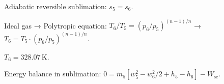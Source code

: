 Adiabatic reversible sublimation: \( s_5 = s_6 \).  

Ideal gas → Polytropic equation:  
\( T_6 / T_5 = (p_6 / p_5)^{(n-1)/n} \)  
→ \( T_6 = T_5 \cdot (p_6 / p_5)^{(n-1)/n} \).  

\( T_6 = 328.07 \, \text{K} \).  

Energy balance in sublimation:  
\( 0 = \dot{m}_5 \left[ w_5^2 - w_6^2 / 2 + h_5 - h_6 \right] - \dot{W}_{\text{sc}} \).